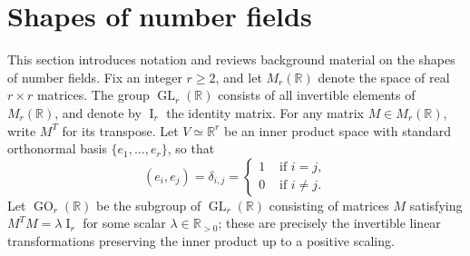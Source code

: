 \documentclass[table]{amsart}
\numberwithin{equation}{section}
\begin{document}
\section{Shapes of number fields}\label{sec1}
\par This section introduces notation and reviews background material on the shapes of number fields. Fix an integer $r \geq 2$, and let $M_r(\mathbb{R})$ denote the space of real $r \times r$ matrices. The group $\operatorname{GL}_r(\mathbb{R})$ consists of all invertible elements of $M_r(\mathbb{R})$, and denote by $\operatorname{I}_r$ the identity matrix. For any matrix $M \in M_r(\mathbb{R})$, write $M^T$ for its transpose. Let $V \simeq \mathbb{R}^r$ be an inner product space with standard orthonormal basis $\{e_1, \dots, e_r\}$, so that \[(e_i, e_j) = \delta_{i,j}=\begin{cases}
    1 & \text{ if }i=j,\\
    0 & \text{ if }i\neq j.
\end{cases}\] Let $\operatorname{GO}_r(\mathbb{R})$ be the subgroup of $\operatorname{GL}_r(\mathbb{R})$ consisting of matrices $M$ satisfying $M^T M = \lambda \operatorname{I}_r$ for some scalar $\lambda \in \mathbb{R}_{>0}$; these are precisely the invertible linear transformations preserving the inner product up to a positive scaling.
\end{document}
